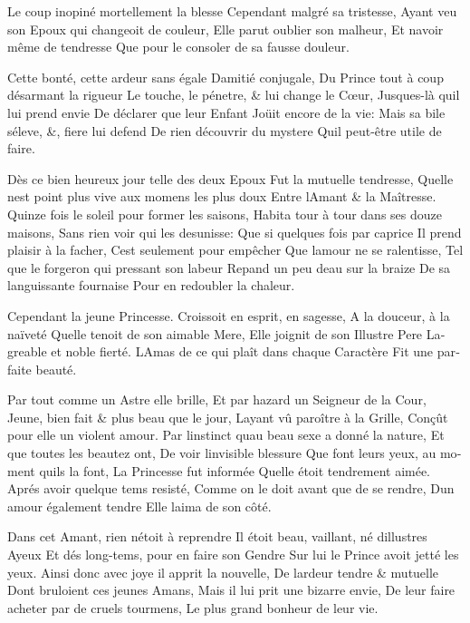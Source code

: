 \documentclass[14pt,a4paper]{memoir}
\begin{document}
\begin{otherlanguage}{french}
{Le coup inopiné mortellement la blesse} {Cependant malgré sa
tristesse,} {Ayant veu son Epoux qui changeoit de couleur,} {Elle parut
oublier son malheur,} {Et n\textquotesingle avoir même de tendresse}
{Que pour le consoler de sa fausse douleur.}

{Cette bonté, cette ardeur sans égale} {D\textquotesingle amitié
conjugale,} {Du Prince tout à coup désarmant la rigueur} {Le touche, le
pénetre, \& lui change le Cœur,} {Jusques-là qu\textquotesingle il lui
prend envie} {De déclarer que leur Enfant} {Joüit encore de la vie:}
{Mais sa bile s\textquotesingle éleve, \&, fiere lui defend} {De rien
découvrir du mystere} {Qu\textquotesingle il peut-être utile de faire.}

{Dès ce bien heureux jour telle des deux Epoux} {Fut la mutuelle
tendresse,} {Qu\textquotesingle elle n\textquotesingle est point plus
vive aux momens les plus doux} {Entre l\textquotesingle Amant \& la
Maîtresse.} {Quinze fois le soleil pour former les saisons,} {Habita
tour à tour dans ses douze maisons,} {Sans rien voir qui les desunisse:}
{Que si quelques fois par caprice} {Il prend plaisir à la facher,}
{C\textquotesingle est seulement pour empêcher} {Que
l\textquotesingle amour ne se ralentisse,} {Tel que le forgeron qui
pressant son labeur} {Repand un peu d\textquotesingle eau sur la braize}
{De sa languissante fournaise} {Pour en redoubler la chaleur.}

{Cependant la jeune Princesse.} {Croissoit en esprit, en sagesse,} {A la
douceur, à la naïveté} {Qu\textquotesingle elle tenoit de son aimable
Mere,} {Elle joignit de son Illustre Pere} {L\textquotesingle agreable
et noble fierté.} {L\textquotesingle Amas de ce qui plaît dans chaque
Caractère} {Fit une parfaite beauté.}

{Par tout comme un Astre elle brille,} {Et par hazard un Seigneur de la
Cour,} {Jeune, bien fait \& plus beau que le jour,}
{L\textquotesingle ayant vû paroître à la Grille,} {Conçût pour elle un
violent amour.} {Par l\textquotesingle instinct qu\textquotesingle au
beau sexe a donné la nature, } {Et que toutes les beautez ont,} {De voir
l\textquotesingle invisible blessure} {Que font leurs yeux, au moment
qu\textquotesingle ils la font,} {La Princesse fut informée}
{Qu\textquotesingle elle étoit tendrement aimée.} {Aprés avoir quelque
tems resisté,} {Comme on le doit avant que de se rendre,}
{D\textquotesingle un amour également tendre} {Elle
l\textquotesingle aima de son côté.}

{Dans cet Amant, rien n\textquotesingle étoit à reprendre} {Il étoit
beau, vaillant, né d\textquotesingle illustres Ayeux} {Et dés long-tems,
pour en faire son Gendre} {Sur lui le Prince avoit jetté les yeux.}
{Ainsi donc avec joye il apprit la nouvelle,} {De
l\textquotesingle ardeur tendre \& mutuelle} {Dont bruloient ces jeunes
Amans,} {Mais il lui prit une bizarre envie,} {De leur faire acheter par
de cruels tourmens,} {Le plus grand bonheur de leur vie.}


\end{otherlanguage}
\end{document}
